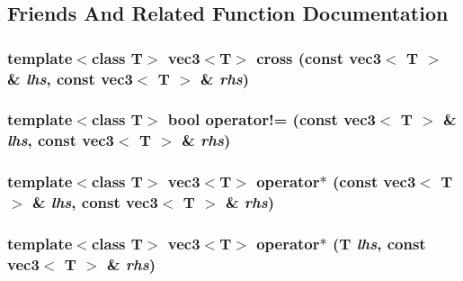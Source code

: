 \subsection{Friends And Related Function Documentation}
\hypertarget{classnv_1_1vec3_82d0fe479389dc0f4c0e51f504427f56}{
\subsubsection[{cross}]{\setlength{\rightskip}{0pt plus 5cm}template$<$class T$>$ {\bf vec3}$<$T$>$ cross (const {\bf vec3}$<$ T $>$ \& {\em lhs}, \/  const {\bf vec3}$<$ T $>$ \& {\em rhs})}}
\label{classnv_1_1vec3_82d0fe479389dc0f4c0e51f504427f56}


\hypertarget{classnv_1_1vec3_cd3e3772974abccec731c328931e1aa7}{
\subsubsection[{operator!=}]{\setlength{\rightskip}{0pt plus 5cm}template$<$class T$>$ bool operator!= (const {\bf vec3}$<$ T $>$ \& {\em lhs}, \/  const {\bf vec3}$<$ T $>$ \& {\em rhs})}}
\label{classnv_1_1vec3_cd3e3772974abccec731c328931e1aa7}


\hypertarget{classnv_1_1vec3_b0365df5a4a15bca5aa86f13f0642d33}{
\subsubsection[{operator$\ast$}]{\setlength{\rightskip}{0pt plus 5cm}template$<$class T$>$ {\bf vec3}$<$T$>$ operator$\ast$ (const {\bf vec3}$<$ T $>$ \& {\em lhs}, \/  const {\bf vec3}$<$ T $>$ \& {\em rhs})}}
\label{classnv_1_1vec3_b0365df5a4a15bca5aa86f13f0642d33}


\hypertarget{classnv_1_1vec3_1abb03b326653c94eedbff6b967a0fa8}{
\subsubsection[{operator$\ast$}]{\setlength{\rightskip}{0pt plus 5cm}template$<$class T$>$ {\bf vec3}$<$T$>$ operator$\ast$ (T {\em lhs}, \/  const {\bf vec3}$<$ T $>$ \& {\em rhs})}}
\label{classnv_1_1vec3_1abb03b326653c94eedbff6b967a0fa8}


